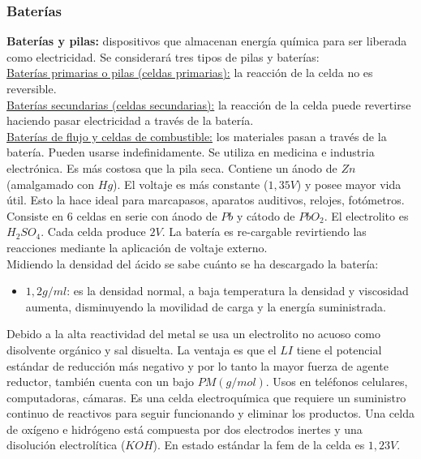         \subsubsection{Baterías}
        \textbf{Baterías y pilas:} dispositivos que almacenan energía química para ser liberada como electricidad. Se considerará tres tipos de pilas y baterías: \\[5pt]
        \underline{Baterías primarias o pilas (celdas primarias):} la reacción de la celda no es reversible. \\[5pt]
        \underline{Baterías secundarias (celdas secundarias):} la reacción de la celda puede revertirse haciendo pasar electricidad a través de la batería. \\[5pt]
        \underline{Baterías de flujo y celdas de combustible:} los materiales pasan a través de la batería. Pueden usarse indefinidamente.
        \sangria{} Se utiliza en medicina e industria electrónica. Es más costosa que la pila seca. Contiene un ánodo de $Zn$ (amalgamado con $Hg$). El voltaje es más constante ($1,35V$) y posee mayor vida útil. Esto la hace ideal para marcapasos, aparatos auditivos, relojes, fotómetros.
        \sangria{} Consiste en $6$ celdas en serie con ánodo de $Pb$ y cátodo de $PbO_2$. El electrolito es $H_2SO_4$. Cada celda produce $2V$. La batería es re-cargable revirtiendo las reacciones mediante la aplicación de voltaje externo. \\ \sangria{} Midiendo la densidad del ácido se sabe cuánto se ha descargado la batería:
        \begin{itemize}
            \item $1,2 g/ml$: es la densidad normal, a baja temperatura la densidad y viscosidad aumenta, disminuyendo la movilidad de carga y la energía suministrada.
        \end{itemize}
        \sangria{} Debido a la alta reactividad del metal se usa un electrolito no acuoso como disolvente orgánico y sal disuelta. La ventaja es que el $LI$ tiene el potencial estándar de reducción más negativo y por lo tanto la mayor fuerza de agente reductor, también cuenta con un bajo $PM (g/mol)$. Usos en teléfonos celulares, computadoras, cámaras.
        \sangria{} Es una celda electroquímica que requiere un suministro continuo de reactivos para seguir funcionando y eliminar los productos. Una celda de oxígeno e hidrógeno está compuesta por dos electrodos inertes y una disolución electrolítica ($KOH$). En estado estándar la fem de la celda es $1,23V$.
